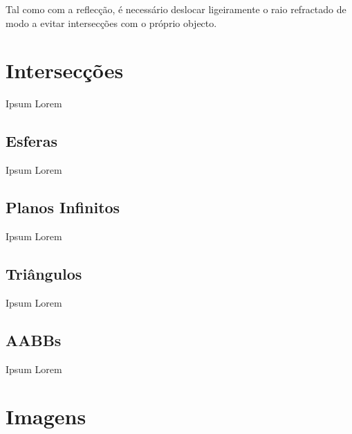 \documentclass{article}
\begin{document}
\begin{multicols}{2}
    Tal como com a reflecção, é necessário deslocar ligeiramente o raio refractado
    de modo a evitar intersecções com o próprio objecto.

    \section{Intersecções}

    Ipsum Lorem

    \subsection{Esferas}

    Ipsum Lorem

    \subsection{Planos Infinitos}

    Ipsum Lorem

    \subsection{Triângulos}

    Ipsum Lorem

    \subsection{AABBs}

    Ipsum Lorem

    \end{multicols}

    \newpage
    \section{Imagens}
\end{document}
